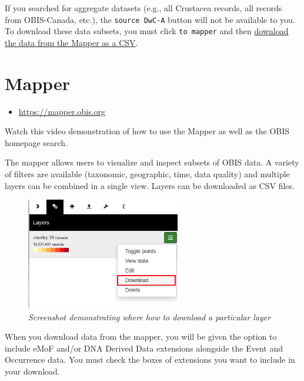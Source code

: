 \documentclass[
  letterpaper,
  DIV=11,
  numbers=noendperiod,
  oneside]{scrreprt}
\providecommand{\tightlist}{%
  \setlength{\itemsep}{0pt}\setlength{\parskip}{0pt}}\usepackage{longtable,booktabs,array}
\begin{document}
If you searched for aggregate datasets (e.g., all Crustacea records, all
records from OBIS-Canada, etc.), the \texttt{source\ DwC-A} button will
not be available to you. To download these data subsets, you must click
\texttt{to\ mapper} and then \protect\hyperlink{mapper}{download the
data from the Mapper as a CSV}.

\hypertarget{mapper}{%
\section{Mapper}\label{mapper}}

\begin{itemize}
\tightlist
\item
  \url{https://mapper.obis.org}
\end{itemize}

Watch this video demonstration of how to use the Mapper as well as the
OBIS homepage search.

The mapper allows users to visualize and inspect subsets of OBIS data. A
variety of filters are available (taxonomic, geographic, time, data
quality) and multiple layers can be combined in a single view. Layers
can be downloaded as CSV files.

\begin{figure}

{\centering \includegraphics[width=0.6\textwidth,height=\textheight]{images/mapper-DL.png}

}

\caption{\emph{Screenshot demonstrating where how to download a
particular layer}}

\end{figure}

When you download data from the mapper, you will be given the option to
include eMoF and/or DNA Derived Data extensions alongside the Event and
Occurrence data. You must check the boxes of extensions you want to
include in your download.
\end{document}
